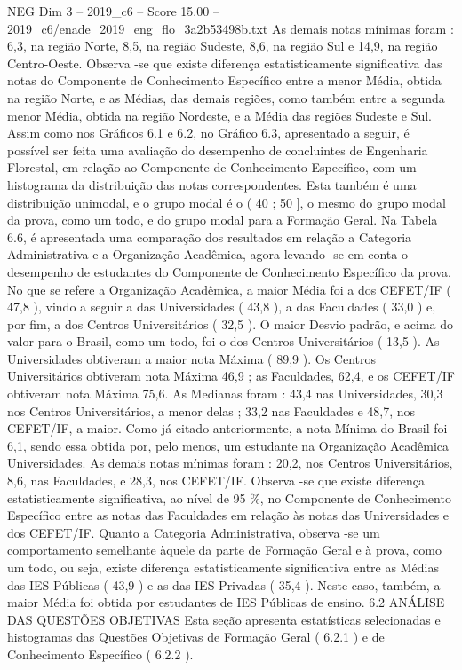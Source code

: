 \begin{textsample}{NEG Dim 3 – 2019\_c6 – Score 15.00 – 2019\_c6/enade\_2019\_eng\_flo\_3a2b53498b.txt}
As demais notas mínimas foram : 6,3, na região Norte, 8,5, na região Sudeste, 8,6, na região Sul e 14,9, na região Centro-Oeste.
Observa -se que existe diferença estatisticamente significativa das notas do Componente de Conhecimento Específico entre a menor Média, obtida na região Norte, e as Médias, das demais regiões, como também entre a segunda menor Média, obtida na região Nordeste, e a Média das regiões Sudeste e Sul.
Assim como nos Gráficos 6.1 e 6.2, no Gráfico 6.3, apresentado a seguir, é possível ser feita uma avaliação do desempenho de concluintes de Engenharia Florestal, em relação ao Componente de Conhecimento Específico, com um histograma da distribuição das notas correspondentes.
Esta também é uma distribuição unimodal, e o grupo modal é o ( 40 ; 50 ], o mesmo do grupo modal da prova, como um todo, e do grupo modal para a Formação Geral.
Na Tabela 6.6, é apresentada uma comparação dos resultados em relação a Categoria Administrativa e a Organização Acadêmica, agora levando -se em conta o desempenho de estudantes do Componente de Conhecimento Específico da prova.
No que se refere a Organização Acadêmica, a maior Média foi a dos CEFET/IF ( 47,8 ), vindo a seguir a das Universidades ( 43,8 ), a das Faculdades ( 33,0 ) e, por fim, a dos Centros Universitários ( 32,5 ).
O maior Desvio padrão, e acima do valor para o Brasil, como um todo, foi o dos Centros Universitários ( 13,5 ).
As Universidades obtiveram a maior nota Máxima ( 89,9 ).
Os Centros Universitários obtiveram nota Máxima 46,9 ; as Faculdades, 62,4, e os CEFET/IF obtiveram nota Máxima 75,6.
As Medianas foram : 43,4 nas Universidades, 30,3 nos Centros Universitários, a menor delas ; 33,2 nas Faculdades e 48,7, nos CEFET/IF, a maior.
Como já citado anteriormente, a nota Mínima do Brasil foi 6,1, sendo essa obtida por, pelo menos, um estudante na Organização Acadêmica Universidades.
As demais notas mínimas foram : 20,2, nos Centros Universitários, 8,6, nas Faculdades, e 28,3, nos CEFET/IF.
Observa -se que existe diferença estatisticamente significativa, ao nível de 95 \%, no Componente de Conhecimento Específico entre as notas das Faculdades em relação às notas das Universidades e dos CEFET/IF.
Quanto a Categoria Administrativa, observa -se um comportamento semelhante àquele da parte de Formação Geral e à prova, como um todo, ou seja, existe diferença estatisticamente significativa entre as Médias das IES Públicas ( 43,9 ) e as das IES Privadas ( 35,4 ).
Neste caso, também, a maior Média foi obtida por estudantes de IES Públicas de ensino. 6.2 ANÁLISE DAS QUESTÕES OBJETIVAS Esta seção apresenta estatísticas selecionadas e histogramas das Questões Objetivas de Formação Geral ( 6.2.1 ) e de Conhecimento Específico ( 6.2.2 ).

\end{textsample}
